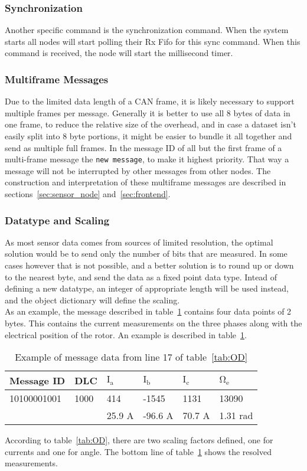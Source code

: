 \subsubsection*{Synchronization}
Another specific command is the synchronization command. 
When the system starts all nodes will start polling their Rx Fifo for this sync command. 
When this command is received, the node will start the millisecond timer.

\subsubsection*{Multiframe Messages}
Due to the limited data length of a CAN frame, it is likely necessary to support multiple frames per message. 
Generally it is better to use all 8 bytes of data in one frame, to reduce the relative size of the overhead, and in case a dataset isn't easily split into 8 byte portions, it might be easier to bundle it all together and send as multiple full frames. 
In the message ID of all but the first frame of a multi-frame message the \texttt{new message}, to make it highest priority.
That way a message will not be interrupted by other messages from other nodes.
The construction and interpretation of these multiframe messages are described in sections~\ref{sec:sensor_node} and~\ref{sec:frontend}.

\subsubsection*{Datatype and Scaling}
As most sensor data comes from sources of limited resolution, the optimal solution would be to send only the number of bits that are measured. 
In some cases however that is not possible, and a better solution is to round up or down to the nearest byte, and send the data as a fixed point data type.
Intead of defining a new datatype, an integer of appropriate length will be used instead, and the object dictionary will define the scaling. \\

As an example, the message described in table~\ref{tab:message17_OD} contains four data points of 2 bytes. 
This contains the current measurements on the three phases along with the electrical position of the rotor.
An example is described in table~\ref{tab:message17_OD}.

\begin{table}
	\centering
	\begin{tabular}{l|l|l|l|l|l}
		Message ID & DLC & $\mathrm{I_a}$ & $\mathrm{I_b}$ & $\mathrm{I_c}$ & $\mathrm{\Omega _e}$ \\ 
		\hline
		10100001001 & 1000 & 414 & -1545 & 1131 & 13090 \\
		\hline
		 & & 25.9 A & -96.6 A & 70.7 A & 1.31 rad
	\end{tabular}
	\caption{Example of message data from line 17 of table~\ref{tab:OD}}
	\label{tab:message17_OD}
\end{table}
According to table~\ref{tab:OD}, there are two scaling factors defined, one for currents and one for angle. 
The bottom line of table~\ref{tab:message17_OD} shows the resolved measurements.
